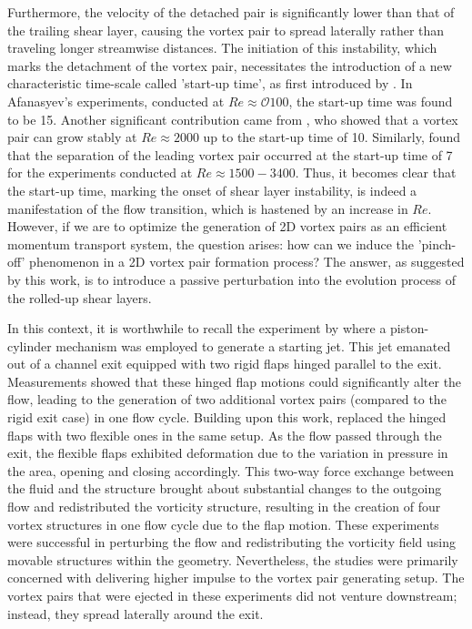 \documentclass[final,3p,10pt,times,review,authoryear]{elsarticle}
\begin{document}
	Furthermore, the velocity of the detached pair is significantly lower than that of the trailing shear layer, causing the vortex pair to spread laterally rather than traveling longer streamwise distances. The initiation of this instability, which marks the detachment of the vortex pair, necessitates the introduction of a new characteristic time-scale called 'start-up time', as first introduced by \cite{Afanasyev2006}. In Afanasyev's experiments, conducted at $Re\approx \mathcal{O}100$, the start-up time was found to be 15. Another significant contribution came from \cite{pedrizzetti_2010}, who showed that a vortex pair can grow stably at $Re\approx2000$ up to the start-up time of 10. Similarly, \cite{Gao_Yu_2016} found that the separation of the leading vortex pair occurred at the start-up time of 7 for the experiments conducted at $Re\approx1500-3400$. Thus, it becomes clear that the start-up time, marking the onset of shear layer instability, is indeed a manifestation of the flow transition, which is hastened by an increase in $Re$. However, if we are to optimize the generation of 2D vortex pairs as an efficient momentum transport system, the question arises: how can we induce the 'pinch-off' phenomenon in a 2D vortex pair formation process? The answer, as suggested by this work, is to introduce a passive perturbation into the evolution process of the rolled-up shear layers. 
	
	In this context, it is worthwhile to recall the experiment by \cite{arakeri_2013} where a piston-cylinder mechanism was employed to generate a starting jet. This jet emanated out of a channel exit equipped with two rigid flaps hinged parallel to the exit. Measurements showed that these hinged flap motions could significantly alter the flow, leading to the generation of two additional vortex pairs (compared to the rigid exit case) in one flow cycle. Building upon this work, \cite{arakeri_2018} replaced the hinged flaps with two flexible ones in the same setup. As the flow passed through the exit, the flexible flaps exhibited deformation due to the variation in pressure in the area, opening and closing accordingly. This two-way force exchange between the fluid and the structure brought about substantial changes to the outgoing flow and redistributed the vorticity structure, resulting in the creation of four vortex structures in one flow cycle due to the flap motion. These experiments were successful in perturbing the flow and redistributing the vorticity field using movable structures within the geometry. Nevertheless, the studies were primarily concerned with delivering higher impulse to the vortex pair generating setup. The vortex pairs that were ejected in these experiments did not venture downstream; instead, they spread laterally around the exit.
	
\end{document}
